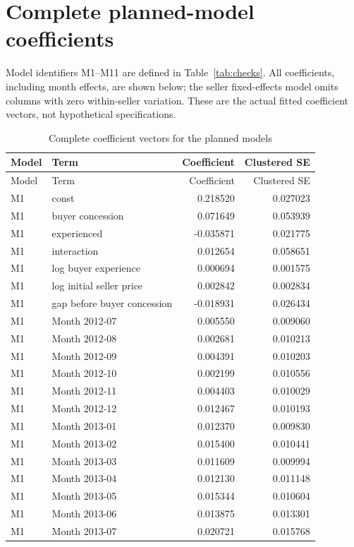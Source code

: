 \documentclass[11pt,a4paper]{article}
\begin{document}
\section{Complete planned-model coefficients}
Model identifiers M1--M11 are defined in Table~\ref{tab:checks}. All coefficients,
including month effects, are shown below; the seller fixed-effects model omits
columns with zero within-seller variation. These are the actual fitted
coefficient vectors, not hypothetical specifications.
\small
\begin{longtable}{lp{8.4cm}rr}
\caption{Complete coefficient vectors for the planned models}\label{tab:full}\\
\toprule
Model & Term & Coefficient & Clustered SE \\
\midrule\endfirsthead
\toprule
Model & Term & Coefficient & Clustered SE \\
\midrule\endhead
\bottomrule\endfoot
M1 & const & 0.218520 & 0.027023 \\
M1 & buyer concession & 0.071649 & 0.053939 \\
M1 & experienced & -0.035871 & 0.021775 \\
M1 & interaction & 0.012654 & 0.058651 \\
M1 & log buyer experience & 0.000694 & 0.001575 \\
M1 & log initial seller price & 0.002842 & 0.002834 \\
M1 & gap before buyer concession & -0.018931 & 0.026434 \\
M1 & Month 2012-07 & 0.005550 & 0.009060 \\
M1 & Month 2012-08 & 0.002681 & 0.010213 \\
M1 & Month 2012-09 & 0.004391 & 0.010203 \\
M1 & Month 2012-10 & 0.002199 & 0.010556 \\
M1 & Month 2012-11 & 0.004403 & 0.010029 \\
M1 & Month 2012-12 & 0.012467 & 0.010193 \\
M1 & Month 2013-01 & 0.012370 & 0.009830 \\
M1 & Month 2013-02 & 0.015400 & 0.010441 \\
M1 & Month 2013-03 & 0.011609 & 0.009994 \\
M1 & Month 2013-04 & 0.012130 & 0.011148 \\
M1 & Month 2013-05 & 0.015344 & 0.010604 \\
M1 & Month 2013-06 & 0.013875 & 0.013301 \\
M1 & Month 2013-07 & 0.020721 & 0.015768 \\

\end{longtable}
\end{document}
